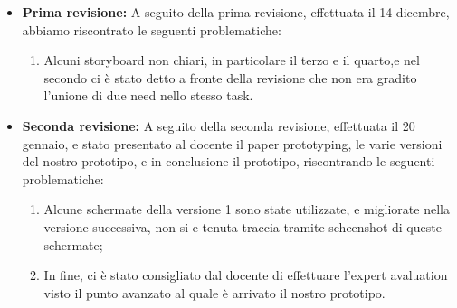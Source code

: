 \documentclass{article}
\begin{document}
\begin{minipage}{0,40\textwidth} 
\begin{itemize}

    \item \textbf{Prima revisione:} A seguito della prima revisione, effettuata il 14 dicembre, abbiamo riscontrato le seguenti problematiche:
    \begin{enumerate}
        \item Alcuni storyboard non chiari, in particolare il terzo e il quarto,e nel secondo ci è stato detto a fronte della revisione che non era gradito l'unione di due need nello stesso task.
    \end{enumerate}
\end{itemize}
\end{minipage}
\hspace{2cm}
\begin{minipage}{0.40\textwidth}
\begin{itemize}

    \item\textbf{Seconda revisione:} A seguito della seconda revisione, effettuata il 20 gennaio, e stato presentato al docente il paper prototyping, le varie versioni del nostro prototipo, e in conclusione il prototipo, riscontrando le seguenti problematiche:
    \begin{enumerate}
        \item Alcune schermate della versione 1 sono state utilizzate, e migliorate nella versione successiva, non si e tenuta traccia tramite scheenshot di queste schermate;
        \item In fine, ci è stato consigliato dal docente di effettuare l'expert avaluation visto il punto avanzato al quale è arrivato il nostro prototipo.

    \end{enumerate}
    
    \end{itemize}
\end{minipage} 
\end{document}
